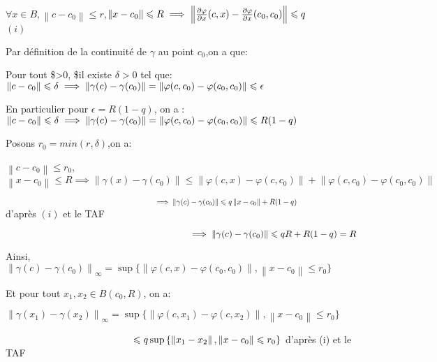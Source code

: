 \documentclass[11pt]{article}
\begin{document}
\(\forall x \in B, \left\lVert c-c_0 \right\lVert \leqslant r\),\(\left\lVert x-c_0 \right\lVert \leqslant R \implies \left\lVert \frac{\partial \varphi}{\partial x}(c,x)-\frac{\partial \varphi}{\partial x}(c_0,c_0)\right\lVert \leqslant q \hspace{50px}\)
\((i)\)

Par définition de la continuité de \(\gamma\) au point \(c_0\),on a que:

Pour tout \$\epsilon \textgreater{}0, \$il existe \(\delta >0\) tel que:
\(\left\lVert c-c_0 \right\lVert \leqslant \delta \implies \left\lVert\gamma (c)-\gamma (c_0)\right\lVert=\left\lVert \varphi (c,c_0)-\varphi (c_0,c_0)\right\lVert \leqslant \epsilon \hspace{50px}\)

En particulier pour \(\epsilon = R(1-q)\), on a
:\(\left\lVert c-c_0 \right\lVert \leqslant \delta \implies \left\lVert\gamma (c)-\gamma (c_0)\right\lVert=\left\lVert \varphi (c,c_0)-\varphi (c_0,c_0)\right\lVert \leqslant R(1-q) \hspace{50px}\)

Posons \(r_0 = min(r,\delta)\),on a:

\(\left\lVert c-c_0 \right\lVert \leqslant r_0\),\(\left\lVert x-c_0 \right\lVert \leqslant R \implies \left\lVert\gamma (x)-\gamma (c_0)\right\lVert \leqslant \left\lVert \varphi (c,x)-\varphi(c,c_0) \right\lVert +\left\lVert \varphi (c,c_0)-\varphi(c_0,c_0) \right\lVert\)

\(\hspace{200px}\implies \left\lVert\gamma (c)-\gamma (c_0)\right\lVert\leqslant q\left\lVert x-c_0 \right\lVert +R(1-q) \hspace{80px}\)
d'après \((i)\) et le TAF

\(\hspace{200px}\implies \left\lVert\gamma (c)-\gamma (c_0)\right\lVert\leqslant qR+R(1-q)=R\)

Ainsi,
\(\left\lVert\gamma (c)-\gamma (c_0)\right\lVert _\infty= \sup{\{\left\lVert\varphi (c,x)-\varphi (c_0,c_0)\right\lVert, \left\lVert x-c_0 \right\lVert \leqslant r_0}\}\)

Et pour tout \(x_1,x_2\in B(c_0,R)\), on a:

\(\left\lVert\gamma (x_1)-\gamma (x_2) \right\lVert _\infty= \sup{\{\left\lVert\varphi (c,x_1)-\varphi (c,x_2)\right\lVert, \left\lVert x-c_0 \right\lVert \leqslant r_0}\}\)

\(\hspace{130px}\leqslant q\sup{ \{ \left\lVert x_1 -x_2 \right\lVert, \left\lVert x-c_0 \right\lVert \leqslant r_0 \} }\)
d'après (i) et le TAF
\end{document}
